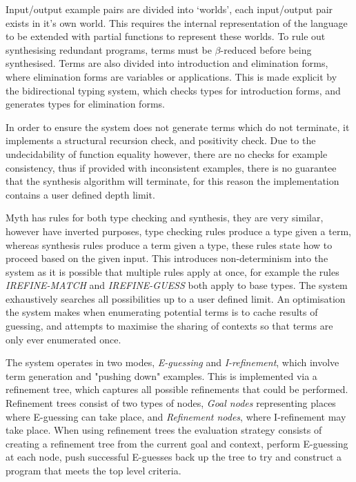 \documentclass[a4paper]{article}
\begin{document}
Input/output example pairs are divided into `worlds', each input/output pair exists in it's own world. This requires the internal representation 
of the language to be extended with partial functions to represent these worlds. 
To rule out synthesising redundant programs, terms must be \(\beta\)-reduced before being synthesised. Terms are also divided into introduction 
and elimination forms, where elimination forms are variables or applications. This is made explicit by the bidirectional typing system, 
which checks types for introduction forms, and generates types for elimination forms.

In order to ensure the system does not generate terms which do not terminate, it implements a structural recursion check, and positivity check.
Due to the undecidability of function equality however, there are no checks for example consistency, thus if provided with inconsistent examples, there
is no guarantee that the synthesis algorithm will terminate, for this reason the implementation contains a user defined depth limit. 

Myth has rules for both type checking and synthesis, they are very similar, however have inverted purposes, type checking rules produce a 
type given a term, whereas synthesis rules produce a term given a type, these rules state how to proceed based on the given input. This introduces
non-determinism into the system as it is possible that multiple rules apply at once, for example the rules \emph{IREFINE-MATCH} and \emph{IREFINE-GUESS} both 
apply to base types. The system exhaustively searches all possibilities up to a user defined limit. An optimisation the system makes when enumerating potential 
terms is to cache results of guessing, and attempts to maximise the sharing of contexts so that terms are only ever enumerated once. 

The system operates in two modes, \emph{E-guessing} and \emph{I-refinement}, which involve term generation and "pushing down" examples. This is implemented via a 
refinement tree, which captures all possible refinements that could be performed. Refinement trees consist of two types of nodes, \emph{Goal nodes} representing 
places where E-guessing can take place, and \emph{Refinement nodes}, where I-refinement may take place. When using refinement 
trees the evaluation strategy consists of creating a refinement tree from the current goal and context, perform E-guessing at 
each node, push successful E-guesses back up the tree to try and construct a program that meets the top level criteria. 
\end{document}
